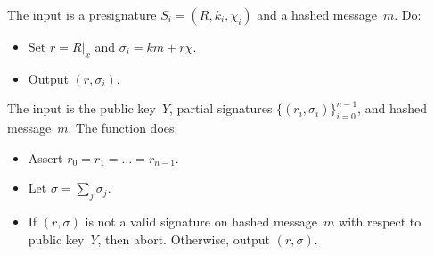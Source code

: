 \documentclass[11pt]{article}
\newcommand{\ignore}[1]{}
\newcommand{\affineX}[1]{#1|_{\textit{x}}}
\newcommand{\?}[1]{\stackrel{?}{#1}}
\newcommand{\todo}[1]{\textbf{\color{Red}{TBD: #1}}}
\begin{document}
\medskip{} The input is a presignature $S_i = (R, k_i, \chi_i)$ and a hashed message~$m$. Do:
%
        \begin{itemize}
            \item Set $r = \affineX{R}$ and $\sigma_i = k m + r \chi$.
            \item Output $(r, \sigma_i)$.
        \end{itemize}
        

    \medskip{} The input is the public key~$Y$, partial signatures $\{(r_i, \sigma_i)\}_{i=0}^{n-1}$, and hashed message~$m$.
The function does:
        \begin{itemize}
            \item Assert $r_0 = r_1 = \dots = r_{n-1}$.
            \item Let $\sigma = \sum_j \sigma_j$.
            \item If $(r, \sigma)$ is not a valid signature on hashed message~$m$ with respect to public key~$Y$, then abort. Otherwise, 
            output $(r, \sigma)$.
        \end{itemize}


\ignore{
\section{Further Optimizations}

\todo{decide whether we want to move it into jira tickets/github issues}

\begin{enumerate}
    \item Full use of CRT: the CRT optimization can be used (when applicable) for all computations involving exponentiation, not just Paillier encryption

    \item Combine CRT and fixed-based multiexponentiation optimizations

    \item In some cases, can do probabilistic bath checks. It may also be possible to combine several of the ZK proofs. (Note, however, that these optimizations involve deviations from~\cite{cggmp21}.)
\end{enumerate}
}
\end{document}
